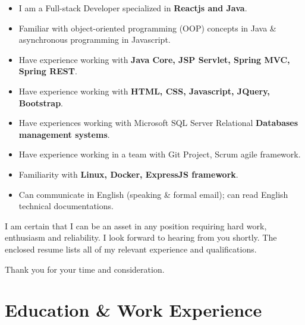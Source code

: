 \documentclass[11pt,a4paper,sans]{moderncv}        %
\begin{document}
\begin{itemize}
  \item I am a Full-stack Developer specialized in \textbf{Reactjs and Java}.
  \item Familiar with object-oriented programming (OOP) concepts in Java \& asynchronous programming in Javascript.
  \item Have experience working with \textbf{Java Core, JSP Servlet, Spring MVC, Spring REST}.
  \item Have experience working with \textbf{HTML, CSS, Javascript, JQuery, Bootstrap}.
  \item Have experiences working with Microsoft SQL Server Relational \textbf{Databases management systems}. %
  \item Have experience working in a team with Git Project, Scrum agile framework.
  \item Familiarity with \textbf{Linux, Docker, ExpressJS framework}.
  \item Can communicate in English (speaking \& formal email); can read English technical documentations.
\end{itemize}

I am certain that I can be an asset in any position requiring hard work, enthusiasm and reliability. I look forward to hearing from you shortly. The enclosed resume lists all of my relevant experience and qualifications.

Thank you for your time and consideration.

\makeletterclosing

\newpage


\makecvtitle

\section{Education \& Work Experience}
\end{document}
